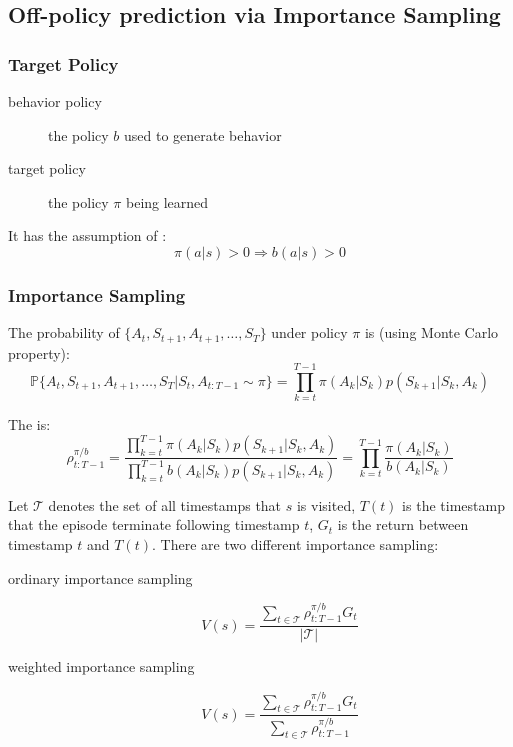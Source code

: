 \subsection{Off-policy prediction via Importance Sampling}

\subsubsection{Target Policy}

\begin{description}
	\item[behavior policy] the policy $b$ used to generate behavior
	\item[target policy] the policy $\pi$ being learned
\end{description}

It has the assumption of : 
\begin{equation}
	\pi(a|s) > 0 \Rightarrow b(a|s) >0
\end{equation}


\subsubsection{Importance Sampling}

The probability of $\{ A_t, S_{t+1},A_{t+1},\dots,S_T  \}$ under policy $\pi$ is (using Monte Carlo property):
\begin{equation}
	\mathbb{P} \{ A_t, S_{t+1},A_{t+1},\dots,S_T | S_t, A_{t:T-1} \sim \pi \} = \prod_{k=t}^{T-1} \pi(A_k|S_k)p(S_{k+1}|S_k,A_k)
\end{equation}

The  is:
\begin{equation}\label{importancsamplingratio}
	\rho_{t:T-1}^{\pi / b} = \frac{\prod\limits_{k=t}^{T-1} \pi(A_k|S_k)p(S_{k+1}|S_k,A_k)}{\prod\limits_{k=t}^{T-1} b(A_k|S_k)p(S_{k+1}|S_k,A_k)} = \prod_{k=t}^{T-1} \frac{\pi(A_k|S_k)}{b(A_k|S_k)}
\end{equation}

Let $\mathcal{T}$ denotes the set of all timestamps that $s$ is visited, $T(t)$ is the timestamp that the episode terminate following timestamp $t$, $G_t$ is the return between timestamp $t$ and $T(t)$. There are two different importance sampling:
\begin{description}
	\item [ordinary importance sampling] \begin{equation}
		V(s) = \frac{\sum\limits_{t \in \mathcal{T}} \rho_{t:T-1}^{\pi/b} G_t}{|\mathcal{T}|}
	\end{equation}
	\item [weighted importance sampling] \begin{equation}
		V(s) = \frac{\sum\limits_{t \in \mathcal{T}} \rho_{t:T-1}^{\pi/b} G_t}{\sum\limits_{t \in \mathcal{T}} \rho_{t:T-1}^{\pi/b}}
	\end{equation}
\end{description}

